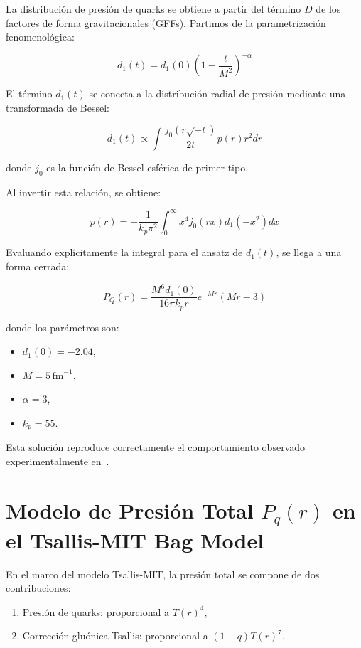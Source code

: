 La distribuci\'on de presi\'on de quarks se obtiene a partir del t\'ermino \( D \) de los factores de forma gravitacionales (GFFs). Partimos de la parametrizaci\'on fenomenol\'ogica:

\begin{equation}
d_1(t) = d_1(0) \left( 1 - \frac{t}{M^2} \right)^{-\alpha}
\end{equation}

El t\'ermino \( d_1(t) \) se conecta a la distribuci\'on radial de presi\'on mediante una transformada de Bessel:

\begin{equation}
d_1(t) \propto \int \frac{j_0(r \sqrt{-t})}{2t} p(r) r^2 dr
\end{equation}

donde \( j_0 \) es la funci\'on de Bessel esf\'erica de primer tipo.

Al invertir esta relaci\'on, se obtiene:

\begin{equation}
p(r) = -\frac{1}{k_p \pi^2} \int_0^\infty x^4 j_0(r x) d_1(-x^2) dx
\end{equation}

Evaluando explícitamente la integral para el ansatz de \( d_1(t) \), se llega a una forma cerrada:

\begin{equation}
P_Q(r) = \frac{M^6 d_1(0)}{16\pi k_p r} e^{-M r} (M r - 3)
\end{equation}

donde los parámetros son:
\begin{itemize}
\item \( d_1(0) = -2.04 \),
\item \( M = 5\,\mathrm{fm}^{-1} \),
\item \( \alpha = 3 \),
\item \( k_p = 55 \).
\end{itemize}

Esta soluci\'on reproduce correctamente el comportamiento observado experimentalmente en~\cite{Burkert_2018}.

\section{Modelo de Presi\'on Total \( P_q(r) \) en el Tsallis-MIT Bag Model}

En el marco del modelo Tsallis-MIT, la presi\'on total se compone de dos contribuciones:

\begin{enumerate}
    \item Presi\'on de quarks: proporcional a \( T(r)^4 \),
    \item Correcci\'on glu\'onica Tsallis: proporcional a \( (1-q) T(r)^7 \).
\end{enumerate}

